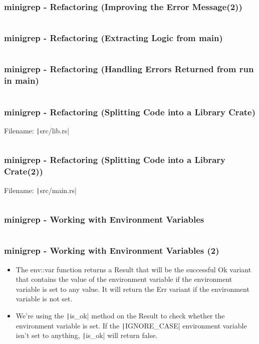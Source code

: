 \documentclass{beamer}
\begin{document}
\begin{frame}[fragile]
	\frametitle{minigrep - Refactoring (Improving the Error Message(2))}
	\inputminted{rust}{./code/grep8.rs}
\end{frame}


\begin{frame}[fragile]
	\frametitle{minigrep - Refactoring (Extracting Logic from main)}
	\inputminted{rust}{./code/grep9.rs}
\end{frame}

\begin{frame}[fragile]
	\frametitle{minigrep - Refactoring (Handling Errors Returned from run in main)}
	\inputminted{rust}{./code/grep10.rs}
\end{frame}

\begin{frame}[fragile]
	\frametitle{minigrep - Refactoring (Splitting Code into a Library Crate)}
	Filename: \texttt|src/lib.rs|
	\inputminted{rust}{./code/grep11.rs}
\end{frame}

\begin{frame}[fragile]
	\frametitle{minigrep - Refactoring (Splitting Code into a Library Crate(2))}
	Filename: \texttt|src/main.rs|
	\inputminted{rust}{./code/grep12.rs}
\end{frame}

\begin{frame}[fragile]
	\frametitle{minigrep - Working with Environment Variables}
	\inputminted{rust}{./code/grep13.rs}

\end{frame}

\begin{frame}[fragile]
	\frametitle{minigrep - Working with Environment Variables (2)}
	\begin{itemize}
		\item The env::var function returns a Result that will be the successful Ok variant that contains the value of the environment variable if the environment variable is set to any value. It will return the Err variant if the environment variable is not set.
		\item 	We’re using the \texttt|is_ok| method on the Result to check whether the environment variable is set. If the \texttt|IGNORE_CASE|  environment variable isn’t set to anything, \texttt|is_ok|  will return false.
	\end{itemize}
\end{frame}
\end{document}
